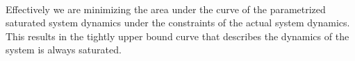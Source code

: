 \begin{align}
        \label{eqn::optimization_prob}
\end{align}

Effectively we are minimizing the area under the curve of the parametrized saturated system dynamics under the
constraints of the actual system dynamics. This results in the tightly upper bound curve that describes the dynamics of
the system is always saturated.



